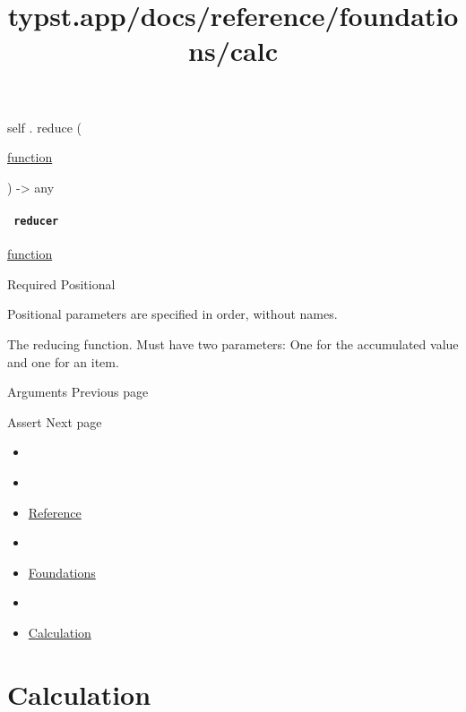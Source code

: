 self { . } { reduce } (

{ \href{/docs/reference/foundations/function/}{function} }

) -\textgreater{} { any }

\paragraph{\texorpdfstring{\texttt{\ reducer\ }}{ reducer }}\label{definitions-reduce-reducer}

\href{/docs/reference/foundations/function/}{function}

{Required} {{ Positional }}

\label{definitions-reduce-reducer-positional-tooltip}
Positional parameters are specified in order, without names.

The reducing function. Must have two parameters: One for the accumulated
value and one for an item.

\href{/docs/reference/foundations/arguments/}{\pandocbounded{}}

{ Arguments } { Previous page }

\href{/docs/reference/foundations/assert/}{\pandocbounded{}}

{ Assert } { Next page }


\title{typst.app/docs/reference/foundations/calc}

\begin{itemize}
\tightlist
\item
  \href{/docs}{}
\item
  
\item
  \href{/docs/reference/}{Reference}
\item
  
\item
  \href{/docs/reference/foundations/}{Foundations}
\item
  
\item
  \href{/docs/reference/foundations/calc}{Calculation}
\end{itemize}

\section{Calculation}\label{summary}

